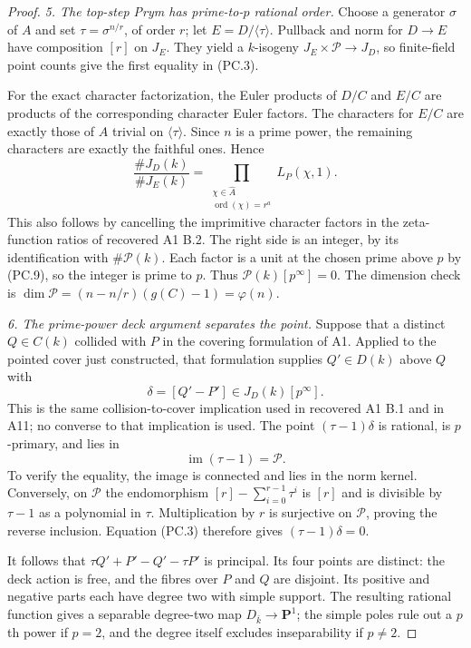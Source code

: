 \documentclass[11pt,a4paper]{article}
\begin{document}
\begin{proof}
\emph{5. The top-step Prym has prime-to-$p$ rational order.}
Choose a generator $\sigma$ of $A$ and set
$\tau=\sigma^{n/r}$, of order $r$; let $E=D/\langle\tau\rangle$.
Pullback and norm for $D\to E$ have composition $[r]$ on $J_E$.
They yield a $k$-isogeny
$J_E\times\mathcal P\to J_D$, so finite-field point counts give
the first equality in (PC.3).

For the exact character factorization, the Euler products of
$D/C$ and $E/C$ are products of the corresponding character
Euler factors. The characters for $E/C$ are exactly those of $A$
trivial on $\langle\tau\rangle$. Since $n$ is a prime power,
the remaining characters are exactly the faithful ones. Hence
\[
 \frac{\#J_D(k)}{\#J_E(k)}
       =\prod_{\substack{\chi\in\widehat A\\
                          \operatorname{ord}(\chi)=r^a}}
                       L_P(\chi,1).
 \tag{PC.10}
\]
This also follows by cancelling the imprimitive character factors
in the zeta-function ratios of recovered A1 B.2. The right side
is an integer, by its identification with $\#\mathcal P(k)$.
Each factor is a unit at the chosen prime above $p$ by (PC.9),
so the integer is prime to $p$. Thus
$\mathcal P(k)[p^\infty]=0$. The dimension check is
$\dim\mathcal P=(n-n/r)(g(C)-1)=\varphi(n)$.

\emph{6. The prime-power deck argument separates the point.}
Suppose that a distinct $Q\in C(k)$ collided with $P$ in the
covering formulation of A1. Applied to the pointed cover just
constructed, that formulation supplies $Q'\in D(k)$ above $Q$
with
\[
                  \delta=[Q'-P']\in J_D(k)[p^\infty].
 \tag{PC.11}
\]
This is the same collision-to-cover implication used in recovered
A1 B.1 and in A11; no converse to that implication is used.
The point $(\tau-1)\delta$ is rational, is $p$-primary, and lies in
\[
             \operatorname{im}(\tau-1)=\mathcal P.
 \tag{PC.12}
\]
To verify the equality, the image is connected and lies in the
norm kernel. Conversely, on $\mathcal P$ the endomorphism
$[r]-\sum_{i=0}^{r-1}\tau^i$ is $[r]$ and is divisible by
$\tau-1$ as a polynomial in $\tau$. Multiplication by $r$ is
surjective on $\mathcal P$, proving the reverse inclusion.
Equation (PC.3) therefore gives $(\tau-1)\delta=0$.

It follows that
$\tau Q'+P'-Q'-\tau P'$ is principal. Its four points are
distinct: the deck action is free, and the fibres over $P$ and
$Q$ are disjoint. Its positive and negative parts each have
degree two with simple support. The resulting rational function
gives a separable degree-two map $D_{\bar k}\to\mathbf P^1$;
the simple poles rule out a $p$th power if $p=2$, and the degree
itself excludes inseparability if $p\ne2$.


\end{proof}
\end{document}
